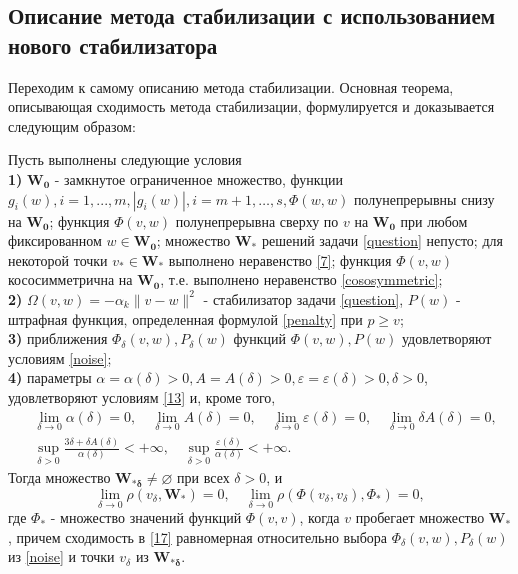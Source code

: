 \subsection{Описание метода стабилизации с использованием нового стабилизатора}
Переходим к самому описанию метода стабилизации. Основная теорема, описывающая сходимость метода стабилизации, формулируется и доказывается следующим образом: 
\begin{theo}
	\label{theor-1}
	Пусть выполнены следующие условия\\
	\textbf{1)} $\mathbf{W_0}$ - замкнутое ограниченное множество, функции $g_i(w),i=1,...,m,|g_i(w)|,i=m+1,\ldots,s,\Phi(w,w)$ полунепрерывны снизу на $\mathbf{W_0}$; функция $\Phi(v,w)$ полунепрерывна сверху по $v$ на $\mathbf{W_0}$ при любом фиксированном $w\in\mathbf{W_0}$; множество $\mathbf{W_*}$ решений задачи \eqref{question} непусто; для некоторой точки $v_*\in\mathbf{W_*}$ выполнено неравенство \eqref{7}; функция $\Phi(v,w)$ кососимметрична на $\mathbf{W_0}$, т.е. выполнено неравенство \eqref{cososymmetric};\\
	\textbf{2)} $\Omega(v,w)=-\alpha_k\|v-w\|^2$ - стабилизатор задачи \eqref{question}, $P(w)$ - штрафная функция, определенная формулой \eqref{penalty} при $p\geqslant v$;\\
	\textbf{3)} приближения $\Phi_{\delta}(v,w),P_{\delta}(w)$ функций $\Phi(v,w),P(w)$ удовлетворяют условиям \eqref{noise};\\
	\textbf{4)} параметры $\alpha=\alpha(\delta)>0,A=A(\delta)>0,\varepsilon=\varepsilon(\delta)>0,\delta>0$, удовлетворяют условиям \eqref{13} и, кроме того,
	\begin{equation}
	\label{16}
	\begin{aligned}
	&\lim_{\delta\rightarrow 0}\alpha(\delta)=0,\quad \lim_{\delta\rightarrow 0}A(\delta)=0,\quad \lim_{\delta\rightarrow 0}\varepsilon(\delta)=0,\quad\lim_{\delta\rightarrow 0} \delta A(\delta)=0,\\
	&\sup_{\delta>0}\frac{3\delta+\delta A(\delta)}{\alpha(\delta)}<+\infty,\quad \sup_{\delta>0}\frac{\varepsilon(\delta)}{\alpha(\delta)}<+\infty.
	\end{aligned}
	\end{equation}
	Тогда множество $\mathbf{W_{*\delta}}\ne\varnothing$ при всех $\delta>0$, и 
	\begin{equation}
	\label{17}
	\lim_{\delta\rightarrow 0}\rho(v_{\delta},\mathbf{W_*})=0,\quad\lim_{\delta\rightarrow 0} \rho(\Phi(v_{\delta},v_{\delta}),\Phi_*)=0,
	\end{equation}
	где $\Phi_*$ - множество значений функций $\Phi(v,v)$, когда $v$ пробегает множество $\mathbf{W_*}$, причем сходимость в \eqref{17} равномерная относительно выбора $\Phi_{\delta}(v,w),P_{\delta}(w)$ из \eqref{noise} и точки $v_{\delta}$ из $\mathbf{W_{*\delta}}$.
\end{theo}
